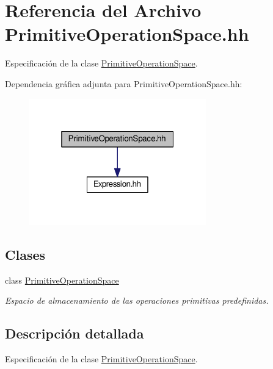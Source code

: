 \hypertarget{_primitive_operation_space_8hh}{}\section{Referencia del Archivo Primitive\+Operation\+Space.\+hh}
\label{_primitive_operation_space_8hh}


Especificación de la clase \hyperlink{class_primitive_operation_space}{Primitive\+Operation\+Space}.  


Dependencia gráfica adjunta para Primitive\+Operation\+Space.\+hh\+:\nopagebreak
\begin{figure}[H]
\begin{center}
\leavevmode
\includegraphics[width=217pt]{_primitive_operation_space_8hh__incl}
\end{center}
\end{figure}
\subsection*{Clases}
\begin{DoxyCompactItemize}
\item 
class \hyperlink{class_primitive_operation_space}{Primitive\+Operation\+Space}
\begin{DoxyCompactList}\small\item\em Espacio de almacenamiento de las operaciones primitivas predefinidas. \end{DoxyCompactList}\end{DoxyCompactItemize}


\subsection{Descripción detallada}
Especificación de la clase \hyperlink{class_primitive_operation_space}{Primitive\+Operation\+Space}. 

